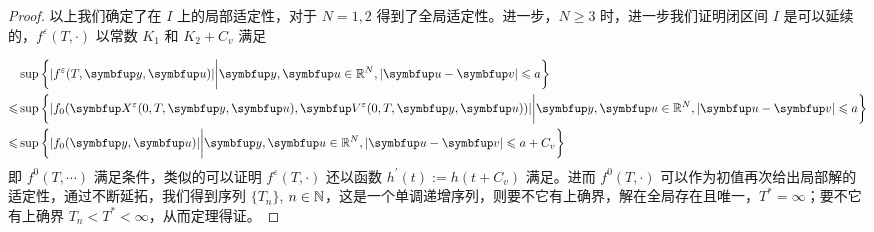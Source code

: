 \begin{proof}
以上我们确定了在 $I$ 上的局部适定性，对于 $N=1,2$ 得到了全局适定性。进一步，$N\geqslant 3$ 时，进一步我们证明闭区间 $I$ 是可以延续的，$f^{\varepsilon}\left(T, \cdot\right)$ 以常数 $K_{1}$ 和 $K_{2}+C_{v}$ 满足\supremumf 

$$
\begin{aligned}
    &\sup \left\{|f^\varepsilon(T,\vect{y}, \vect{u})| \bigg| \vect{y},\vect{u}\in \bbR^{N}, |\vect{u}-\vect{v}|\leqslant a  \right\} \\
\leqslant &\sup \left\{|f_0(\vect{X}^\varepsilon(0, T,\vect{y}, \vect{u}), \vect{V}^\varepsilon(0, T,\vect{y}, \vect{u}))| \bigg| \vect{y},\vect{u}\in \bbR^{N}, |\vect{u}-\vect{v}|\leqslant a  \right\} \\
\leqslant &\sup \left\{|f_0(\vect{y}, \vect{u})| \bigg| \vect{y},\vect{u}\in \bbR^{N}, |\vect{u}-\vect{v}|\leqslant a +C_v \right\} 
\end{aligned}
$$
即 $f^0(T,\cdots)$ 满足\supremumf 条件，类似的可以证明 $f^{\varepsilon}\left(T, \cdot\right)$ 还以函数 $h^\prime(t):= h(t+C_v) $ 满足\lipOffVsphere 。进而 $f^{0}\left(T, \cdot\right)$ 可以作为初值再次给出局部解的适定性，通过不断延拓，我们得到序列 $\{T_n\}$, $n\in {\mathbb{N}}$，这是一个单调递增序列，则要不它有上确界，解在全局存在且唯一，$T^{\ast}=\infty$；要不它有上确界 $T_n<T^{\ast}<\infty$，从而定理得证。







\end{proof}
